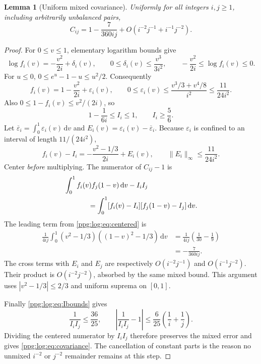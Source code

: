 \documentclass[11pt,letterpaper]{article}
\newtheorem{lemma}[theorem]{Lemma}
\theoremstyle{remark}\newtheorem{remark}[theorem]{Remark}
\numberwithin{equation}{section}
\newcommand{\dd}{\mathrm d}
\begin{document}
\begin{lemma}[Uniform mixed covariance]\label{ppg:log:lem:covariance}
Uniformly for all integers $i,j\ge1$, including arbitrarily unbalanced pairs,
\begin{equation}\label{ppg:log:eq:covariance}
 C_{ij}=1-\frac7{360ij}
       +O\!\left(i^{-2}j^{-1}+i^{-1}j^{-2}\right).
\end{equation}
\end{lemma}
\begin{proof}
For $0\le v\le1$, elementary logarithm bounds give
\[
 \log f_i(v)=-\frac{v^2}{2i}+\delta_i(v),\qquad
 0\le\delta_i(v)\le\frac{v^3}{3i^2},\qquad
 -\frac{v^2}{2i}\le\log f_i(v)\le0.
\]
For $u\le0$, $0\le e^u-1-u\le u^2/2$. Consequently
\begin{equation}\label{ppg:log:eq:uniformfi}
 f_i(v)=1-\frac{v^2}{2i}+\varepsilon_i(v),\qquad
 0\le\varepsilon_i(v)\le\frac{v^3/3+v^4/8}{i^2}
                         \le\frac{11}{24i^2}.
\end{equation}
Also $0\le1-f_i(v)\le v^2/(2i)$, so
\begin{equation}\label{ppg:log:eq:Ibounds}
 1-\frac1{6i}\le I_i\le1,\qquad I_i\ge\frac56.
\end{equation}
Let $\overline\varepsilon_i=\int_0^1\varepsilon_i(v)\,\dd v$ and $E_i(v)=\varepsilon_i(v)-\overline\varepsilon_i$. Because $\varepsilon_i$ is confined to an interval of length $11/(24i^2)$,
\begin{equation}\label{ppg:log:eq:centered}
 f_i(v)-I_i=-\frac{v^2-1/3}{2i}+E_i(v),\qquad
 \|E_i\|_\infty\le\frac{11}{24i^2}.
\end{equation}
Center \emph{before} multiplying. The numerator of $C_{ij}-1$ is
\begin{align*}
 &\int_0^1f_i(v)f_j(1-v)\,\dd v-I_iI_j\\
 &\hspace{12mm}=\int_0^1[f_i(v)-I_i][f_j(1-v)-I_j]\,\dd v.
\end{align*}
The leading term from \eqref{ppg:log:eq:centered} is
\begin{align}\label{ppg:log:eq:covintegral}
 \frac1{4ij}\int_0^1(v^2-1/3)((1-v)^2-1/3)\,\dd v
 &=\frac1{4ij}\left(\frac1{30}-\frac19\right)\nonumber\\
 &=-\frac7{360ij}.
\end{align}
The cross terms with $E_i$ and $E_j$ are respectively $O(i^{-2}j^{-1})$ and $O(i^{-1}j^{-2})$. Their product is $O(i^{-2}j^{-2})$, absorbed by the same mixed bound. This argument uses $|v^2-1/3|\le2/3$ and uniform suprema on $[0,1]$.

Finally \eqref{ppg:log:eq:Ibounds} gives
\[
 \frac1{I_iI_j}\le\frac{36}{25},\qquad
 \left|\frac1{I_iI_j}-1\right|
 \le\frac6{25}\left(\frac1i+\frac1j\right).
\]
Dividing the centered numerator by $I_iI_j$ therefore preserves the mixed error and gives \eqref{ppg:log:eq:covariance}. The cancellation of constant parts is the reason no unmixed $i^{-2}$ or $j^{-2}$ remainder remains at this step.
\end{proof}
\end{document}
